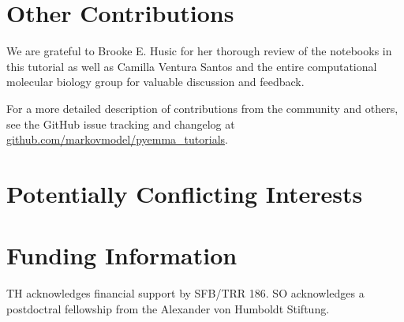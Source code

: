 \documentclass[9pt,tutorial]{livecoms}
\newcommand{\githubrepository}{\url{github.com/markovmodel/pyemma_tutorials}}
\begin{document}
\section{Other Contributions}
%
We are grateful to Brooke E. Husic for her thorough review of the notebooks in this tutorial as well as Camilla Ventura Santos and the entire computational molecular biology group for valuable discussion and feedback.

For a more detailed description of contributions from the community and others, see the GitHub issue tracking and changelog at \githubrepository{}.

\section{Potentially Conflicting Interests}

\section{Funding Information}
TH acknowledges financial support by SFB/TRR 186. SO acknowledges a postdoctral fellowship from the Alexander von Humboldt Stiftung.




\end{document}
